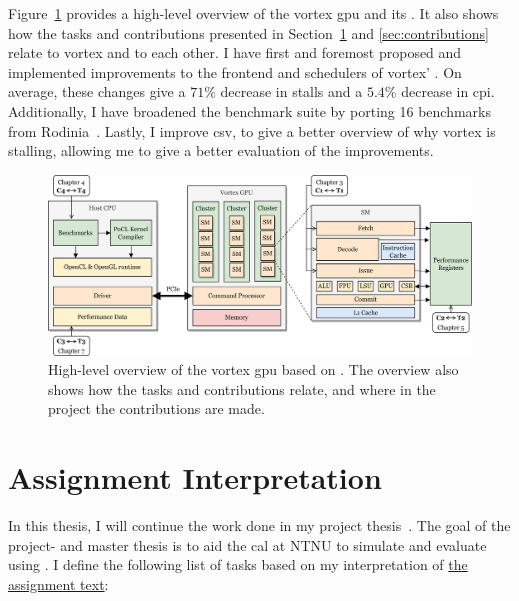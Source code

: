 Figure~\ref{fig:task-contribution} provides a high-level overview of the \Gls{vortex} \acrshort{gpu} and its . It also shows how the tasks and contributions presented in Section~\ref{sec:tasks} and \ref{sec:contributions} relate to \Gls{vortex} and to each other. I have first and foremost proposed and implemented improvements to the frontend and schedulers of \Gls{vortex}' . On average, these changes give a $71\%$ decrease in   stalls and a $5.4\%$ decrease in \acrshort{cpi}. Additionally, I have broadened the  benchmark suite by porting 16 benchmarks from Rodinia~\cite{rodinia, rodinia_characterization}. Lastly, I improve \acrshort{csv}, to give a better overview of why \Gls{vortex} is stalling, allowing me to give a better evaluation of the improvements.

\begin{figure}
    \centering
    \includegraphics[width=\textwidth]{figures/task-contribution-4.png}
    \caption[High-level overview of the \Gls{vortex} \acrshort{gpu}]{High-level overview of the \Gls{vortex} \acrshort{gpu} based on \cite{vortex}. The overview also shows how the tasks and contributions relate, and where in the project the contributions are made.}
    \label{fig:task-contribution}
\end{figure}

\section{Assignment Interpretation} \label{sec:tasks}

In this thesis, I will continue the work done in my project thesis~\cite{Aurud_Project}. The  goal of the project- and master thesis is to aid the \Acrfull{cal} at NTNU to simulate and evaluate  using . I define the following list of tasks based on my interpretation of \hyperref[chap:assignment]{the assignment text}:

